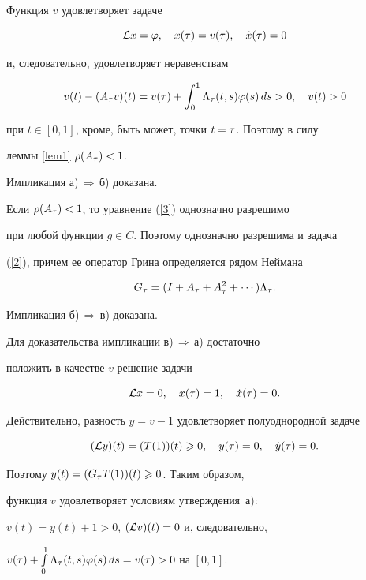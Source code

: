 \begin{pf}


Функция $v$ удовлетворяет задаче


$$


\L x=\phi,\quad x(\t)=v(\t),\quad \Dot x(\t)=0


$$


и, следовательно, удовлетворяет неравенствам


$$


v(t)-(A_\t v)(t)=v(\t)+\int_0^1\La_\t(t,s)\phi(s)\,ds>0,\quad v(t)>0


$$


при $t\in[0,1]$, кроме, быть может, точки $t=\tau$. Поэтому в силу


леммы \ref{lem1}\; $\rho(A_\tau)<1$.


Импликация а)\,$\Rightarrow$\,б) доказана.





Если $\rho(A_\tau)<1$, то уравнение (\ref{3}) однозначно разрешимо


при любой функции $g\in C$. Поэтому однозначно разрешима и задача


(\ref{2}), причем ее оператор Грина определяется рядом Неймана


$$


G_\tau=(I+\At+A_\tau^2+\dotsb)\La_\t.


$$


Импликация б)\,$\Rightarrow$\,в) доказана.





Для доказательства импликации в)\,$\Rightarrow$\,а) достаточно


положить в качестве $v$ решение задачи


$$


\L x=0,\quad x(\t)=1,\quad \Dot x(\t)=0.


$$


Действительно, разность $y=v-1$ удовлетворяет полуоднородной задаче


$$


(\L y)(t)=(T(1))(t)\ge0,\quad y(\t)=0,\quad \Dot y(\t)=0.


$$


Поэтому $y(t)=(G_\tau T(1))(t)\geqslant0$. Таким образом,


функция $v$ удовлетворяет условиям утверждения~а):


$v(t)=y(t)+1>0$, $({\cal L} v)(t)=0$ и, следовательно,


$v(\tau)+\int\limits_0^1\Lambda_\tau(t,s)\varphi(s)\,ds=v(\tau)>0$ на $[0,1]$.


\end{pf}





